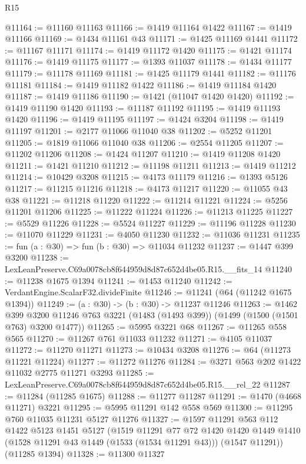 \begin{lexlean}{R15}
\begin{coremodule}
@11164 := @11160 @11163
@11166 := @1419 @11164 @1422
@11167 := @1419 @11166
@11169 := @1434 @11161 @43
@11171 := @1425 @11169 @1441
@11172 := @11167 @11171
@11174 := @1419 @11172 @1420
@11175 := @1421 @11174
@11176 := @1419 @11175
@11177 := @1393 @11037
@11178 := @1434 @11177
@11179 := @11178 @11169
@11181 := @1425 @11179 @1441
@11182 := @11176 @11181
@11184 := @1419 @11182 @1422
@11186 := @1419 @11184 @1420
@11187 := @1419 @11186
@11190 := @1421 (@11047 @1420 @1420)
@11192 := @1419 @11190 @1420
@11193 := @11187 @11192
@11195 := @1419 @11193 @1420
@11196 := @1419 @11195
@11197 := @1424 @3204
@11198 := @1419 @11197
@11201 := @2177 @11066 @11040 @38
@11202 := @5252 @11201
@11205 := @1819 @11066 @11040 @38
@11206 := @2554 @11205
@11207 := @11202 @11206
@11208 := @1424 @11207
@11210 := @1419 @11208 @1420
@11211 := @1421 @11210
@11212 := @11198 @11211
@11213 := @1419 @11212
@11214 := @10429 @3208
@11215 := @4173 @11179
@11216 := @1393 @5126
@11217 := @11215 @11216
@11218 := @4173 @11217
@11220 := @11055 @43 @38
@11221 := @11218 @11220
@11222 := @11214 @11221
@11224 := @5256 @11201 @11206
@11225 := @11222 @11224
@11226 := @11213 @11225
@11227 := @5529 @11226
@11228 := @5524 @11227
@11229 := @11196 @11228
@11230 := @11070 @11229
@11231 := @4050 @11230
@11232 := @11036 @11231
@11235 := fun (a : @30) => fun (b : @30) => @11034 @11232
@11237 := @1447 @399 @3200
@11238 := LexLeanPreserve.C69a0078cb8f644959d8d87c652d4be05.R15.__fits_14
@11240 := @11238 @1675 @1394
@11241 := @1453 @11240
@11242 := VerdantEngine.ScalarF32.divideFinite
@11246 := @11241 (@64 (@11242 @1675 @1394))
@11249 := (a : @30) -> (b : @30) -> @11237 @11246
@11263 := @1462
    @399
    @3200
    @11246
    @763
    @3221
    (@1483 (@1493 @399))
    (@1499 (@1500 (@1501 @763) @3200 @1477))
@11265 := @5995 @3221 @68
@11267 := @11265 @558 @565
@11270 := @11267 @761 @11033 @11232
@11271 := @4105 @11037
@11272 := @11270 @11271
@11273 := @10434 @3208
@11276 := @64 (@11273 @11221 @11224)
@11277 := @11272 @11276
@11284 := @3271 @563 @202 @1422 @11032 @2775 @11271 @3293
@11285 := LexLeanPreserve.C69a0078cb8f644959d8d87c652d4be05.R15.__rel_22
@11287 := @11284 (@11285 @1675)
@11288 := @11277 @11287
@11291 := @1470 (@4668 @11271) @3221
@11295 := @5995 @11291 @142 @558 @569
@11300 := @11295 @760 @11035 @11231 @5127 @11276
@11327 := @1597
    @11291
    @563
    @112
    @1422
    @5123
    @1451
    @5127
    (@1519
      @11291
      @77
      @72
      @1420
      @1420
      @1449
      @1410
      (@1528 @11291 @43 @1449 (@1533 (@1534 @11291 @43)))
      (@1547 @11291))
    (@11285 @1394)
@11328 := @11300 @11327

\end{coremodule}
\end{lexlean}
